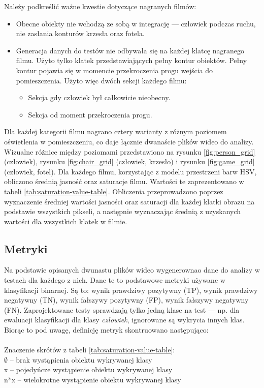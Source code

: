 Należy podkreślić ważne kwestie dotyczące nagranych filmów:
\begin{itemize}
    \item Obecne obiekty nie wchodzą ze sobą w integrację --- człowiek podczas ruchu, nie zasłania konturów krzesła oraz fotela.
    \item Generacja danych do testów nie odbywała się na każdej klatcę nagranego filmu. Użyto tylko klatek przedstawiających pełny kontur obiektów. Pełny kontur pojawia się w momencie przekroczenia progu wejścia do pomieszczenia. Użyto więc dwóch sekcji każdego filmu:
    \begin{itemize}
        \item Sekcja gdy człowiek był całkowicie nieobecny.
        \item Sekcja od moment przekroczenia progu.
    \end{itemize}
\end{itemize}

Dla każdej kategorii filmu nagrano cztery warianty z różnym poziomem oświetlenia w pomieszczeniu, co daje łącznie dwanaście plików wideo do analizy. Wizualne różnice między poziomami przedstawiono na rysunku \ref{fig:person_grid} (człowiek), rysunku \ref{fig:chair_grid} (człowiek, krzesło) i rysunku \ref{fig:game_grid} (człowiek, fotel). 
Dla każdego filmu, korzystając z modelu przestrzeni barw HSV, obliczono średnią jasność oraz saturacje filmu. Wartości te zaprezentowano w tabeli \ref{tab:saturation-value-table}. Obliczenia przeprowadzono poprzez wyznaczenie średniej wartości jasności oraz saturacji dla każdej klatki obrazu na podstawie wszystkich pikseli, a następnie wyznaczając średnią z uzyskanych wartości dla wszystkich klatek w filmie.











\subsection{Metryki}
Na podstawie opisanych dwunastu plików wideo wygenerownao dane do analizy w testach dla każdego z nich. Dane te to podstawowe metryki używane w klasyfikacji binarnej. Są to: wynik prawdziwy pozytywny (TP), wynik prawdziwy negatywny (TN), wynik fałszywy pozytywny (FP), wynik fałszywy negatywny (FN). Zaprojektowane testy sprawdzają tylko jedną klase na test --- np. dla ewaluacji klasyfikacji dla klasy \emph{człowiek}, ignorowane są wykrycia innych klas. Biorąc to pod uwagę, definicję metryk skontruowano następująco: \\ \\ \noindent
Znaczenie skrótów z tabeli \ref{tab:saturation-value-table}: \\
$\emptyset$ -- brak wystąpienia obiektu wykrywanej klasy \\
x -- pojedyńcze wystąpienie obiektu wykrywanej klasy \\
n*x -- wielokrotne wystąpienie obiektu wykrywanej klasy




